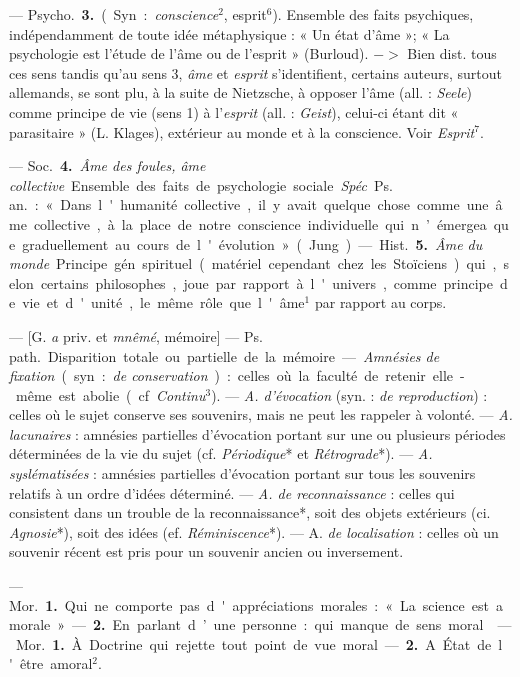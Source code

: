 \begin{itemize}[leftmargin=1cm, label=, itemsep=1pt]
{{{— \si{Psycho.} {\bf 3.} (Syn. : {\it conscience}$^2$,
esprit$^6$). Ensemble des faits psychiques, indépendamment de toute
idée métaphysique : « Un état
d'âme »; « La psychologie est l'étude
de l'âme ou de l'esprit » (Burloud).
$->$ Bien dist. tous ces sens
tandis qu'au sens 3, {\it âme} et {\it esprit}
s'identifient, certains auteurs, surtout allemands, se sont plu, à la suite
de Nietzsche, à opposer l’âme (all. :
{\it Seele}) comme principe de vie (sens 1)
à l'{\it esprit} (all. : {\it Geist}), celui-ci étant
dit « parasitaire » (L. Klages),
extérieur au monde et à la conscience. Voir {\it Esprit}$^7$.

— \si{Soc.} {\bf 4.} {\it Âme des foules, âme
collective}. Ensemble des faits de
psychologie sociale. {\it Spéc}. \si{Ps. an.} :
« Dans l'humanité collective, il y
avait quelque chose comme une âme
collective, à la place de notre conscience individuelle qui n’émergea
que graduellement au cours de
l'évolution » (Jung).

— \si{Hist.} {\bf 5.} {\it Âme du monde}. Principe gén. spirituel (matériel
cependant chez les Stoïciens) qui, selon
certains philosophes, joue par rapport à l'univers, comme principe
de vie et d'unité, le même rôle que
l'âme$^1$ par rapport au corps.

 — [G. {\it a} priv. et {\it mnêmé}, mémoire] — \si{Ps. path.} Disparition
totale ou partielle de la mémoire.
— {\it Amnésies de fixation} (syn. : {\it de
conservation}) : celles où la faculté de
retenir elle-même est abolie (cf. {\it Continu}$^3$).
— {\it A. d'évocation} (syn. : {\it de
reproduction}) : celles où le sujet conserve ses souvenirs, mais ne peut les
rappeler à volonté. — {\it A. lacunaires} :
amnésies partielles d’évocation portant sur une ou plusieurs périodes
déterminées de la vie du sujet (cf.
{\it Périodique}* et {\it Rétrograde}*). — {\it A.
syslématisées} : amnésies partielles
d'évocation portant sur tous les souvenirs relatifs à un ordre d'idées
déterminé. — {\it A. de reconnaissance} :
celles qui consistent dans un trouble
de la reconnaissance*, soit des objets
extérieurs (ci. {\it Agnosie}*), soit des
idées (ef. {\it Réminiscence}*). — A. {\it de
localisation} : celles où un souvenir
récent est pris pour un souvenir
ancien ou inversement.

 — \si{Mor.} {\bf 1.} Qui ne comporte
pas d'appréciations morales : « La
science est amorale ». — {\bf 2.} En parlant d’une personne : qui manque
de sens moral.

 — \si{Mor.} {\bf 1.} À Doctrine qui
rejette tout point de vue moral. —
 {\bf 2.} A État de l'être amoral$^2$.

}}}
\end{itemize}
